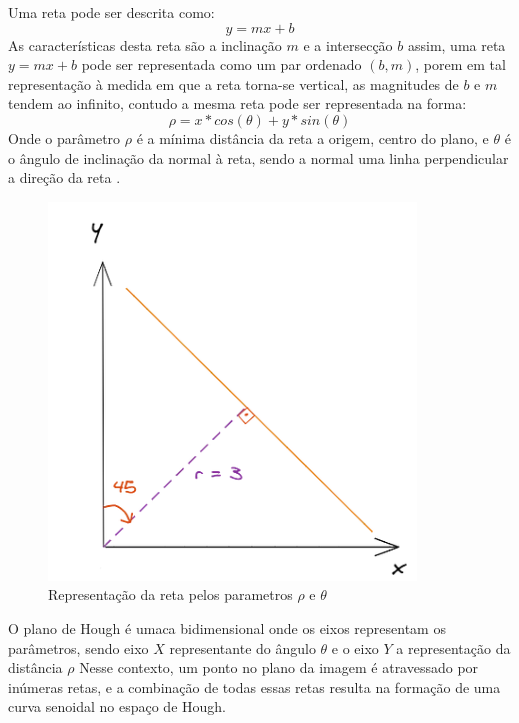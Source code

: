 Uma reta pode ser descrita como: $$y = mx + b$$ As características desta reta são a inclinação $m$ e a intersecção $b$ assim, uma reta $y = mx + b$ pode ser representada como um par ordenado $(b, m)$, porem em tal representação à medida em que a reta torna-se vertical, as magnitudes de $b$ e $m$ tendem ao infinito, contudo a mesma reta pode ser representada na forma:  $$\rho = x*cos(\theta)+y*sin(\theta)$$ Onde o parâmetro $\rho$ é a mínima distância da reta a origem, centro do plano, e $\theta$ é o ângulo de inclinação da normal à reta, sendo a normal uma linha perpendicular a direção da reta \cite{detectBar}.

\begin{figure}[!htb]
	\centering
	\includegraphics[scale=3]{figuras/math/rhotheta.png}
	\caption{Representação da reta pelos parametros $\rho$ e $\theta$}
	\label{fig:Representacao da reta pelos parametros}
\end{figure}

O plano de Hough é umaca bidimensional onde os eixos representam os parâmetros, sendo eixo $X$ representante do ângulo $\theta$ e o eixo $Y$ a representação da distância $\rho$ \cite{transformadaHough1}Nesse contexto, um ponto no plano da imagem é atravessado por inúmeras retas, e a combinação de todas essas retas resulta na formação de uma curva senoidal no espaço de Hough\cite{detectBar}.


